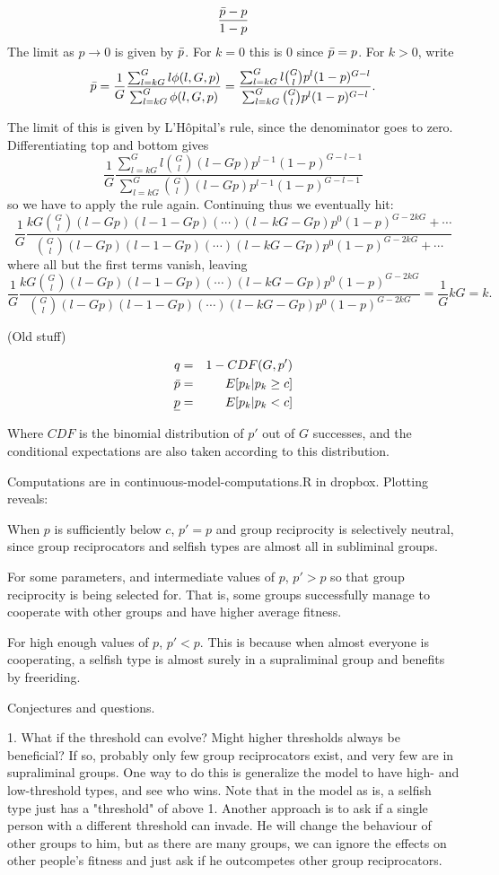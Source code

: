 \documentclass[12pt,a4paper]{article}
\begin{document}
\[
\frac{\bar{p} - p}{1-p}
\]
The limit as $p \to 0$ is given by $\bar{p}$. For $k=0$ this is
0 since $\bar{p} = p$. For $k>0$, write
\[
\bar{p}=\frac{1}{G}\frac{\sum_{l=kG}^{G}l\phi(l,G,p)}{\sum_{l=kG}^{G}\phi(l,G,p)}=\frac{\sum_{l=kG}^{G}l\binom{G}{l}p^{l}(1-p)^{G-l}}{\sum_{l=kG}^{G}\binom{G}{l}p^{l}(1-p)^{G-l}}.
\]

The limit of this is given by L'H\^{o}pital's rule, since the denominator
goes to zero. Differentiating top and bottom gives
\[
\frac{1}{G}\frac{\sum_{l=kG}^{G}l\binom{G}{l}(l-Gp)p^{l-1}(1-p)^{G-l-1}}{\sum_{l=kG}^{G}\binom{G}{l}(l-Gp)p^{l-1}(1-p)^{G-l-1}}
\]
so we have to apply the rule again. Continuing thus we eventually hit:
\[
\frac{1}{G}\frac{kG\binom{G}{l}(l-Gp)(l-1-Gp)(\cdots)(l-kG-Gp)p^{0}(1-p)^{G-2kG}+\cdots}{\binom{G}{l}(l-Gp)(l-1-Gp)(\cdots)(l-kG-Gp)p^{0}(1-p)^{G-2kG}+\cdots}
\]
 where all but the first terms vanish, leaving
\[
\frac{1}{G}\frac{kG\binom{G}{l}(l-Gp)(l-1-Gp)(\cdots)(l-kG-Gp)p^{0}(1-p)^{G-2kG}}{\binom{G}{l}(l-Gp)(l-1-Gp)(\cdots)(l-kG-Gp)p^{0}(1-p)^{G-2kG}}=\frac{1}{G}kG=k.
\]


(Old stuff)

\begin{align}
    q & = & 1 - CDF(G, p') \\
    \bar{p} & = & E[p_k | p_k \ge c] \\
    \underline{p} & = & E[p_k | p_k < c]
\end{align}

Where $CDF$ is the binomial distribution of $p'$ out of $G$ successes, and
the conditional expectations are also taken according to this distribution.

Computations are in continuous-model-computations.R in dropbox. Plotting
reveals:

When $p$ is sufficiently below $c$, $p' = p$ and group reciprocity is 
selectively neutral, since group reciprocators and selfish types are
almost all in subliminal groups.

For some parameters, and intermediate values of $p$, $p'>p$ so that
group reciprocity is being selected for. That is, some groups successfully
manage to cooperate with other groups and have higher average fitness.

For high enough values of $p$, $p' < p$. This is because when almost everyone
is cooperating, a selfish type is almost surely in a supraliminal group
and benefits by freeriding.

Conjectures and questions.

1. What if the threshold can evolve? Might higher thresholds always 
be beneficial? If so, probably only few group reciprocators exist,
and very few are in supraliminal groups. One way to do this is
generalize the model to have high- and low-threshold types, and see
who wins. Note that in the model as is, a selfish type just has a
"threshold" of above 1. Another approach is to ask if a single
person with a different threshold can invade. He will change the
behaviour of other groups to him, but as there are many groups,
we can ignore the effects on other people's fitness and just
ask if he outcompetes other group reciprocators.
\end{document}
